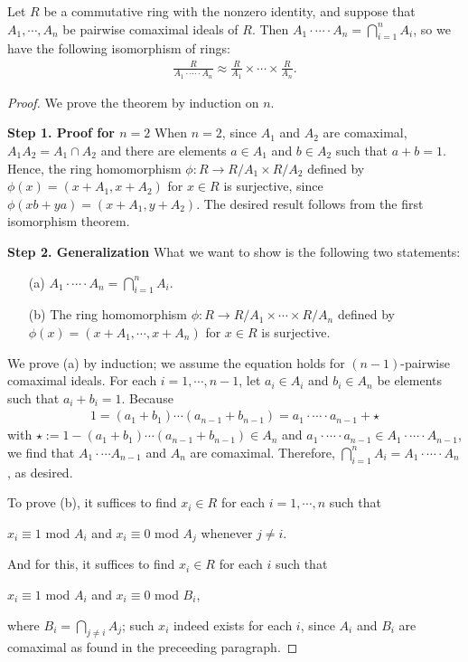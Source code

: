 \begin{thm}
    Let $R$ be a commutative ring with the nonzero identity, and suppose that $A_1, \cdots, A_n$ be pairwise comaximal ideals of $R$.
    Then $A_1\cdot\cdots\cdot A_n=\bigcap_{i=1}^n A_i$, so we have the following isomorphism of rings:
    \begin{align*}
        \frac{R}{A_1\cdot\cdots\cdot A_n} \approx \frac{R}{A_1}\times\cdots\times\frac{R}{A_n}.
    \end{align*}
\end{thm}
\begin{proof}
    We prove the theorem by induction on $n$.
    
    \textbf{Step 1. Proof for $n=2$}\newline
    When $n=2$, since $A_1$ and $A_2$ are comaximal, $A_1A_2=A_1\cap A_2$ and there are elements $a\in A_1$ and $b\in A_2$ such that $a+b=1$.
    Hence, the ring homomorphism $\phi: R\rightarrow R/A_1\times R/A_2$ defined by $\phi(x)=(x+A_1, x+A_2)$ for $x\in R$ is surjective, since $\phi(xb+ya)=(x+A_1, y+A_2)$.
    The desired result follows from the first isomorphism theorem.

    \textbf{Step 2. Generalization}\newline
    What we want to show is the following two statements:
    \begin{enumerate}
        \item[(a)]
        {
            $A_1\cdot\cdots\cdot A_n=\bigcap_{i=1}^n A_i$.
        }
        \item[(b)]
        {
            The ring homomorphism $\phi: R\rightarrow R/A_1\times\cdots\times R/A_n$ defined by $\phi(x)=(x+A_1, \cdots, x+A_n)$ for $x\in R$ is surjective.
        }
    \end{enumerate}
    
    We prove (a) by induction; we assume the equation holds for $(n-1)$-pairwise comaximal ideals.
    For each $i=1, \cdots, n-1$, let $a_i\in A_i$ and $b_i\in A_n$ be elements such that $a_i+b_i=1$.
    Because
    \begin{align*}
        1=(a_1+b_1)\cdots(a_{n-1}+b_{n-1})=a_1\cdot\cdots\cdot a_{n-1}+\star
    \end{align*}
    with $\star:=1-(a_1+b_1)\cdots(a_{n-1}+b_{n-1})\in A_n$ and $a_1\cdot\cdots\cdot a_{n-1}\in A_1\cdot\cdots\cdot A_{n-1}$, we find that $A_1\cdot\cdots A_{n-1}$ and $A_n$ are comaximal.
    Therefore, $\bigcap_{i=1}^n A_i=A_1\cdot\cdots\cdot A_n$, as desired.

    To prove (b), it suffices to find $x_i\in R$ for each $i=1, \cdots, n$ such that
    \begin{center}
        $x_i\equiv 1$ mod $A_i$ and $x_i\equiv 0$ mod $A_j$ whenever $j\neq i$.
    \end{center}
    And for this, it suffices to find $x_i\in R$ for each $i$ such that
    \begin{center}
        $x_i\equiv 1$ mod $A_i$ and $x_i\equiv 0$ mod $B_i$,
    \end{center}
    where $B_i=\bigcap_{j\neq i} A_j$; such $x_i$ indeed exists for each $i$, since $A_i$ and $B_i$ are comaximal as found in the preceeding paragraph.
\end{proof}

